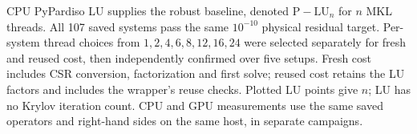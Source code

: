 \providecommand{\PLU}[1]{\mathrm{P\!-\!LU}_{#1}}
CPU PyPardiso LU supplies the robust baseline, denoted $\PLU{n}$ for
$n$ MKL threads. All 107 saved systems pass the same $10^{-10}$ physical
residual target. Per-system thread choices from $1,2,4,6,8,12,16,24$
were selected separately for fresh and reused cost, then independently
confirmed over five setups. Fresh cost includes CSR conversion,
factorization and first solve; reused cost retains the LU factors and
includes the wrapper's reuse checks. Plotted LU points give $n$; LU has
no Krylov iteration count. CPU and GPU measurements use the same saved
operators and right-hand sides on the same host, in separate campaigns.
